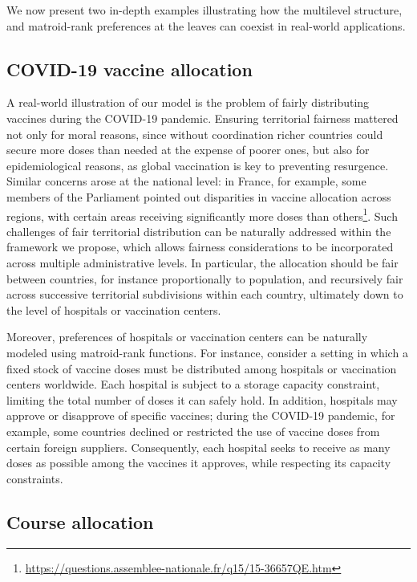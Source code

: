 \documentclass[]{article}
\begin{document}
We now present two in-depth examples illustrating how the multilevel structure, and matroid-rank preferences at the leaves can coexist in real-world applications. 

\subsection{COVID-19 vaccine allocation}

A real-world illustration of our model is the problem of fairly distributing vaccines during the COVID-19 pandemic. Ensuring territorial fairness mattered not only for moral reasons, since without coordination richer countries could secure more doses than needed at the expense of poorer ones, but also for epidemiological reasons, as global vaccination is key to preventing resurgence. Similar concerns arose at the national level: in France, for example, some members of the Parliament pointed out disparities in vaccine allocation across regions, with certain areas receiving significantly more doses than others\footnote{\url{https://questions.assemblee-nationale.fr/q15/15-36657QE.htm}}. Such challenges of fair territorial distribution can be naturally addressed within the framework we propose, which allows fairness considerations to be incorporated across multiple administrative levels. In particular, the allocation should be fair between countries, for instance proportionally to population, and recursively fair across successive territorial subdivisions within each country, ultimately down to the level of hospitals or vaccination centers.

Moreover, preferences of hospitals or vaccination centers can be naturally modeled using matroid-rank functions. For instance, consider a setting in which a fixed stock of vaccine doses must be distributed among hospitals or vaccination centers worldwide. Each hospital is subject to a storage capacity constraint, limiting the total number of doses it can safely hold. In addition, hospitals may approve or disapprove of specific vaccines; during the COVID-19 pandemic, for example, some countries declined or restricted the use of vaccine doses from certain foreign suppliers. Consequently, each hospital seeks to receive as many doses as possible among the vaccines it approves, while respecting its capacity constraints.

\subsection{Course allocation}
\end{document}
